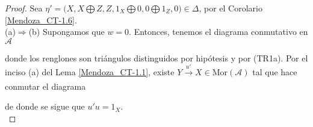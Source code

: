 \documentclass[tesis]{subfiles}
\begin{document}
\begin{proof}

    Sea $\eta' = \big(X,X\bigoplus Z,Z,1_X\bigoplus0,0\bigoplus 1_Z,0\big)\in\Delta$, por el Corolario \ref{Mendoza_CT-1.6}. \\

    (a)$\Rightarrow$(b) Supongamos que $w=0$. Entonces, tenemos el diagrama conmutativo en $\mathscr{A}$
    \begin{center}
    \end{center}
    donde los renglones son triángulos distinguidos por hipótesis y por (TR1a). Por el inciso (a) del Lema \ref{Mendoza_CT-1.1}, existe $Y\xrightarrow[]{u'}X\in\text{Mor}(\mathscr{A})$ tal que hace conmutar el diagrama
    \begin{center}
    \end{center}
    de donde se sigue que $u'u=1_X$. \\


\end{proof}
\end{document}
